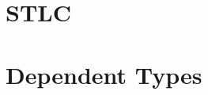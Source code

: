 \documentclass[a4paper]{report}
\begin{document}
\tableofcontents
\chapter{STLC}


\newpage
\newpage

\chapter{Dependent Types}


\printbibliography
\end{document}
